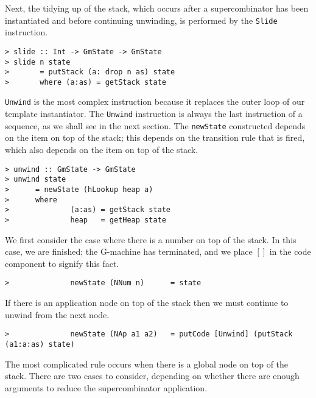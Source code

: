Next, the tidying up of the stack, which occurs after a supercombinator
has been instantiated and before continuing unwinding, is performed by
the \mbox{\tt Slide} instruction.

\gmrule%
{}%
{}
\begin{verbatim}
> slide :: Int -> GmState -> GmState
> slide n state
>       = putStack (a: drop n as) state
>       where (a:as) = getStack state
\end{verbatim}
%
%
\par
\mbox{\tt Unwind} is the most complex instruction because it replaces the outer
loop of our template instantiator. The \mbox{\tt Unwind} instruction is always
the last instruction of a sequence, as we shall see in the next
section. The \mbox{\tt newState} constructed depends on the item on top of the
stack; this depends on the transition rule that is fired, which also
depends on the item on top of the stack.
\begin{verbatim}
> unwind :: GmState -> GmState
> unwind state
>      = newState (hLookup heap a)
>      where
>              (a:as) = getStack state
>              heap   = getHeap state
\end{verbatim}
%
%
\par
We first consider the case where there is a number on top of the
stack. In this case, we are finished; the G-machine has terminated,
and we place $[]$ in the code component to signify this fact.

\gmrule%
{}%
{}
\begin{verbatim}
>              newState (NNum n)      = state
\end{verbatim}
\par
If there is an application node on top of the stack then we must
continue to unwind from the next node.

\gmrule%
{}%
{}
\begin{verbatim}
>              newState (NAp a1 a2)   = putCode [Unwind] (putStack (a1:a:as) state)
\end{verbatim}
\par
The most complicated rule occurs when there is a global node on top of
the stack. There are two cases to consider, depending on whether there are
enough arguments to reduce the supercombinator application.

